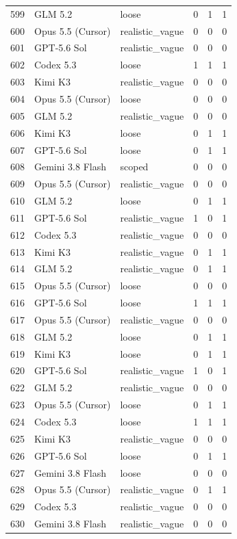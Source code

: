 \begin{tabular}{llllll}
599 & GLM 5.2 & loose & 0 & 1 & 1 \\
600 & Opus 5.5 (Cursor) & realistic\_vague & 0 & 0 & 0 \\
601 & GPT-5.6 Sol & realistic\_vague & 0 & 0 & 0 \\
602 & Codex 5.3 & loose & 1 & 1 & 1 \\
603 & Kimi K3 & realistic\_vague & 0 & 0 & 0 \\
604 & Opus 5.5 (Cursor) & loose & 0 & 0 & 0 \\
605 & GLM 5.2 & realistic\_vague & 0 & 0 & 0 \\
606 & Kimi K3 & loose & 0 & 1 & 1 \\
607 & GPT-5.6 Sol & loose & 0 & 1 & 1 \\
608 & Gemini 3.8 Flash & scoped & 0 & 0 & 0 \\
609 & Opus 5.5 (Cursor) & realistic\_vague & 0 & 0 & 0 \\
610 & GLM 5.2 & loose & 0 & 1 & 1 \\
611 & GPT-5.6 Sol & realistic\_vague & 1 & 0 & 1 \\
612 & Codex 5.3 & realistic\_vague & 0 & 0 & 0 \\
613 & Kimi K3 & realistic\_vague & 0 & 1 & 1 \\
614 & GLM 5.2 & realistic\_vague & 0 & 1 & 1 \\
615 & Opus 5.5 (Cursor) & loose & 0 & 0 & 0 \\
616 & GPT-5.6 Sol & loose & 1 & 1 & 1 \\
617 & Opus 5.5 (Cursor) & realistic\_vague & 0 & 0 & 0 \\
618 & GLM 5.2 & loose & 0 & 1 & 1 \\
619 & Kimi K3 & loose & 0 & 1 & 1 \\
620 & GPT-5.6 Sol & realistic\_vague & 1 & 0 & 1 \\
622 & GLM 5.2 & realistic\_vague & 0 & 0 & 0 \\
623 & Opus 5.5 (Cursor) & loose & 0 & 1 & 1 \\
624 & Codex 5.3 & loose & 1 & 1 & 1 \\
625 & Kimi K3 & realistic\_vague & 0 & 0 & 0 \\
626 & GPT-5.6 Sol & loose & 0 & 1 & 1 \\
627 & Gemini 3.8 Flash & loose & 0 & 0 & 0 \\
628 & Opus 5.5 (Cursor) & realistic\_vague & 0 & 1 & 1 \\
629 & Codex 5.3 & realistic\_vague & 0 & 0 & 0 \\
630 & Gemini 3.8 Flash & realistic\_vague & 0 & 0 & 0 \\

\end{tabular}
